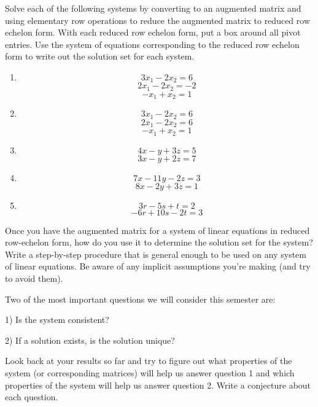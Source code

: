 \begin{question}\label{q3} Solve each of the following systems by converting to an augmented matrix and using elementary row operations to reduce the augmented matrix to reduced row echelon form. With each reduced row echelon form, put a box around all pivot entries. Use the system of equations corresponding to the reduced row echelon form to write out the solution set for each system.
\begin{enumerate}
\item  $$ 3x_1-2x_2=6$$
$$ 2x_1-2x_2=-2 $$
$$-x_1+x_2=1 $$
\item  $$ 3x_1-2x_2=6$$
$$ 2x_1-2x_2=6 $$
$$-x_1+x_2=1 $$
\item  $$4x-y+3z=5$$
$$3x-y+2z=7$$
\item  $$7x-11y-2z=3$$
$$8x-2y+3z=1$$
\item  $$3r-5s+t=2$$
$$-6r+10s-2t=3$$
\end{enumerate}
\end{question}
\begin{question}
Once you have the augmented matrix for a system of linear equations in reduced row-echelon form, how do you use it to determine the solution set for the system? Write a step-by-step procedure that is general enough to be used on any system of linear equations. Be aware of any implicit assumptions you're making (and try to avoid them).

\end{question}



Two of the most important questions we will consider this semester are:

1) Is the system consistent?

2) If a solution exists, is the solution unique?

\begin{question} Look back at your results so far and try to figure out what properties of the system (or corresponding matrices) will help us answer question 1 and which properties of the system will help us answer question 2. Write a conjecture about each question. \end{question}

